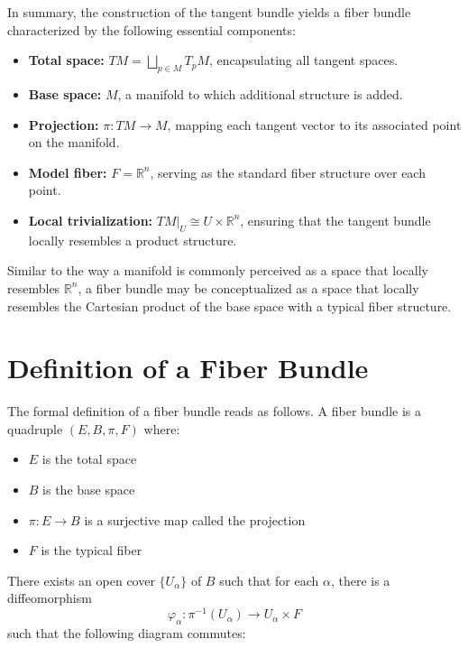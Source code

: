 In summary, the construction of the tangent bundle yields a fiber bundle characterized by the following essential components:
\begin{itemize}
  \item \textbf{Total space:} \( TM = \bigsqcup_{p \in M} T_pM \), encapsulating all tangent spaces.
  \item \textbf{Base space:} \( M \), a manifold to which additional structure is added.
  \item \textbf{Projection:} \( \pi: TM \to M \), mapping each tangent vector to its associated point on the manifold.
  \item \textbf{Model fiber:} \( F = \mathbb{R}^n \), serving as the standard fiber structure over each point.
  \item \textbf{Local trivialization:} \( TM|_U \cong U \times \mathbb{R}^n \), ensuring that the tangent bundle locally resembles a product structure.
\end{itemize}

 Similar to the way a manifold is commonly perceived as a space that locally resembles \( \mathbb{R}^n \), a fiber bundle may be conceptualized as a space that locally resembles the Cartesian product of the base space with a typical fiber structure. 


\section{Definition of a Fiber Bundle}

The formal definition of a fiber bundle reads as follows\cite{FredericSchullerTopologicalmanifoldsmanifoldbundlesLec06FredericSchuller2015, DudekEhreshmanntheoryconnectionprincipalbundlecompendiumphysicists2018}.
A fiber bundle is a quadruple $(E, B, \pi, F)$ where:
\begin{itemize}
  \item $E$ is the total space
  \item $B$ is the base space
  \item $\pi: E \to B$ is a surjective map called the projection
  \item $F$ is the typical fiber
\end{itemize}

There exists an open cover $\{U_\alpha\}$ of $B$ such that for each $\alpha$, there is a diffeomorphism
\[
\varphi_\alpha: \pi^{-1}(U_\alpha) \to U_\alpha \times F
\]
such that the following diagram commutes:


\begin{center}
\end{center}


